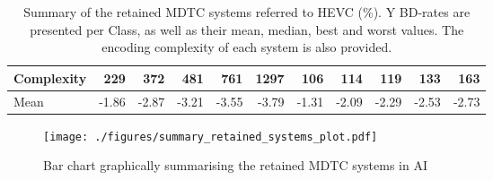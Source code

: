 \documentclass[11pt,a4paper,openright,twoside]{book}
\numberwithin{equation}{section} %
\numberwithin{figure}{section} %
\numberwithin{table}{section} %
\begin{document}
\begin{table}[tb]
\begin{tabularx}{0.95\linewidth}{X|r|rrrr||r|rrrr}
		\hline
        Complexity &   229 &   372 &   481 &   761 &  1297 &   106 &  114  &   119 &   133 &   163 \\
		\hline
        Mean       & -1.86 & -2.87 & -3.21 & -3.55 & -3.79 & -1.31 & -2.09 & -2.29 & -2.53 & -2.73 \\
	\end{tabularx}
	\caption[Summary of the retained \acs{MDTC} systems referred to \ac{HEVC}]
	{Summary of the retained \acs{MDTC} systems referred to \ac{HEVC} (\%).
	Y \acs{BD}-rates are presented per Class, as well as their mean, median, best and worst values.
	The encoding complexity of each system is also provided.}
	\label{tab:summary_final_systems}
\end{table}

\begin{figure}[tb]
	\centering
	\texttt{[image: ./figures/summary\_retained\_systems\_plot.pdf]}
	\caption{Bar chart graphically summarising the retained \acs{MDTC} systems in \acs{AI}}
	\label{fig:final_systems_ai}
\end{figure}
\end{document}
